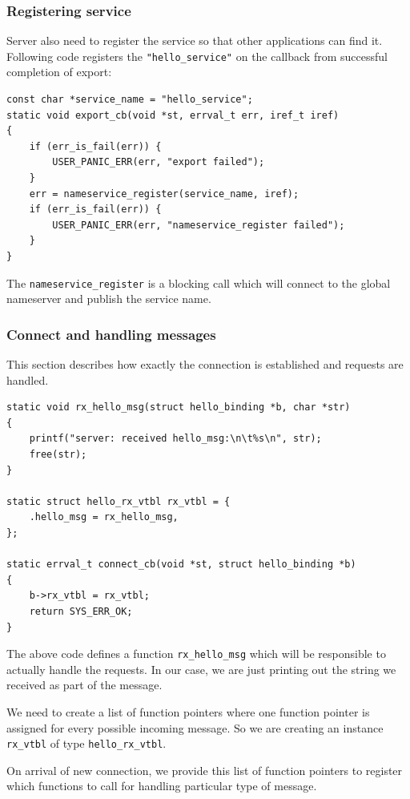\subsubsection{Registering service}
Server also need to register the service so that other applications can find
it.  Following code registers the \texttt{"hello\_service"} on the callback
from successful completion of export:


\begin{verbatim}
const char *service_name = "hello_service";
static void export_cb(void *st, errval_t err, iref_t iref)
{
    if (err_is_fail(err)) {
        USER_PANIC_ERR(err, "export failed");
    }
    err = nameservice_register(service_name, iref);
    if (err_is_fail(err)) {
        USER_PANIC_ERR(err, "nameservice_register failed");
    }
}
\end{verbatim}

The \texttt{nameservice\_register} is a blocking call which will connect
to the global nameserver and publish the service name.

\subsubsection{Connect and handling messages}
This section describes how exactly the connection is established and
requests are handled.

\begin{verbatim}
static void rx_hello_msg(struct hello_binding *b, char *str)
{
    printf("server: received hello_msg:\n\t%s\n", str);
    free(str);
}

static struct hello_rx_vtbl rx_vtbl = {
    .hello_msg = rx_hello_msg,
};

static errval_t connect_cb(void *st, struct hello_binding *b)
{
    b->rx_vtbl = rx_vtbl;
    return SYS_ERR_OK;
}
\end{verbatim}

The above code defines a function \texttt{rx\_hello\_msg} which will be
responsible to actually handle the requests.  In our case, we are just
printing out the string we received as part of the message.

We need to create a list of function pointers where one function pointer
is assigned for every possible incoming message. So we are creating
an instance \texttt{rx\_vtbl} of type \texttt{hello\_rx\_vtbl}.

On arrival of new connection, we provide this list of function pointers
to register which functions to call for handling particular type of message.


